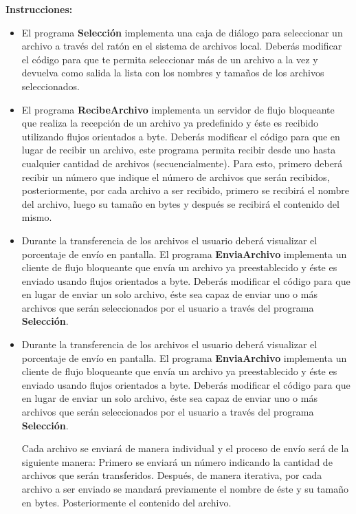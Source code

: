 \documentclass[12pt,twoside]{article}
\begin{document}
\textbf{Instrucciones: }

\begin{itemize}
    \item El programa \textbf{Selecci\'on} implementa una caja de di\'alogo para seleccionar un archivo a trav\'es del rat\'on en el sistema de archivos local. Deber\'as modificar el c\'odigo para que te permita seleccionar m\'as de un archivo a la vez y devuelva como salida la lista con los nombres y tama\~nos de los archivos seleccionados.
    
    \item El programa \textbf{RecibeArchivo} implementa un servidor de flujo bloqueante que realiza la recepci\'on de un archivo ya predefinido y \'este es recibido utilizando flujos orientados a byte. Deber\'as modificar el c\'odigo para que en lugar de recibir un archivo, este programa permita recibir desde uno hasta cualquier cantidad de archivos
(secuencialmente). Para esto, primero deber\'a recibir un n\'umero que indique el n\'umero de archivos que ser\'an recibidos, posteriormente, por cada archivo a ser recibido, primero se recibir\'a el nombre del archivo, luego su tama\~no en bytes y despu\'es se recibir\'a el contenido del mismo.

    \item Durante la transferencia de los archivos el usuario deber\'a visualizar el porcentaje de env\'io en pantalla. El programa \textbf{EnviaArchivo} implementa un cliente de flujo bloqueante que envía un archivo ya preestablecido y \'este es enviado usando flujos orientados a byte. Deber\'as modificar el c\'odigo para que en lugar de enviar un
solo archivo, \'este sea capaz de enviar uno o m\'as archivos que ser\'an seleccionados por el usuario a trav\'es del programa \textbf{Selecci\'on}. 

    \item Durante la transferencia de los archivos el usuario deber\'a visualizar el porcentaje de env\'io en pantalla. El programa \textbf{EnviaArchivo} implementa un cliente de flujo bloqueante que env\'ia un archivo ya preestablecido y \'este es enviado usando flujos orientados a byte. Deber\'as modificar el c\'odigo para que en lugar de enviar un
solo archivo, \'este sea capaz de enviar uno o m\'as archivos que ser\'an seleccionados por el usuario a trav\'es del programa \textbf{Selecci\'on}. 

\newpage

Cada archivo se enviar\'a de manera individual y el proceso de env\'io ser\'a de la siguiente
manera: 
\newline
Primero se enviar\'a un n\'umero indicando la cantidad de archivos que ser\'an transferidos. 
\newline 
Despu\'es, de manera iterativa, por cada archivo a ser enviado se mandar\'a previamente el nombre de \'este y su tama\~no en bytes.
\newline
Posteriormente el contenido del archivo.


\end{itemize}
\end{document}
